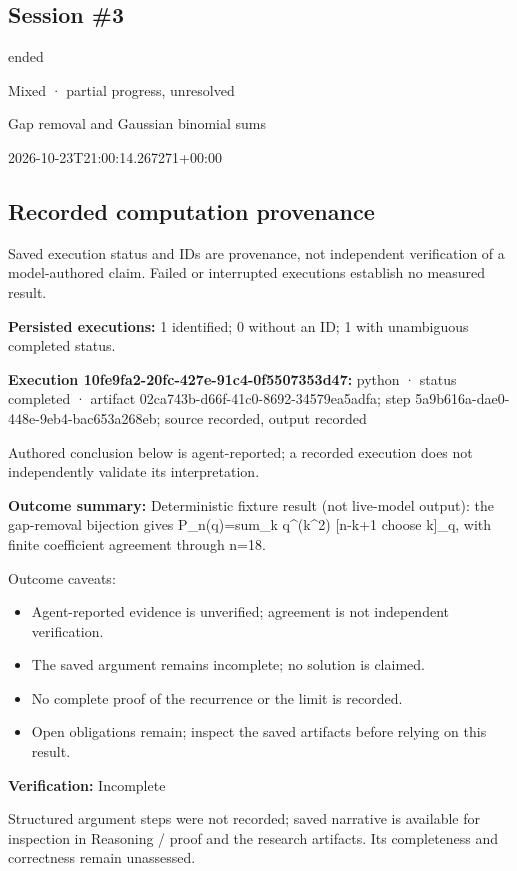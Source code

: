 \documentclass[11pt]{article}
\begin{document}
\subsection{Session \#3}
\begin{description}[style=nextline,font=\normalfont\bfseries,leftmargin=0pt,labelsep=0pt]
\item[Execution status] ended
\item[Outcome] Mixed · partial progress, unresolved
\item[Strategy] Gap removal and Gaussian binomial sums
\item[Started] 2026-10-23T21:00:14.267271+00:00
\end{description}
\subsection{Recorded computation provenance}
Saved execution status and IDs are provenance, not independent verification of a model-authored claim. Failed or interrupted executions establish no measured result.\par
\textbf{Persisted executions:} 1 identified; 0 without an ID; 1 with unambiguous completed status.\par
\textbf{Execution 10fe9fa2-20fc-427e-91c4-0f5507353d47:} python · status completed · artifact 02ca743b-d66f-41c0-8692-34579ea5adfa; step 5a9b616a-dae0-448e-9eb4-bac653a268eb; source recorded, output recorded\par
Authored conclusion below is agent-reported; a recorded execution does not independently validate its interpretation.\par
\textbf{Outcome summary:} Deterministic fixture result (not live-model output): the gap-removal bijection gives P\_n(q)=sum\_k q\textasciicircum{}(k\textasciicircum{}2) [n-k+1 choose k]\_q, with finite coefficient agreement through n=18.\par
Outcome caveats:\par
\begin{itemize}
\item Agent-reported evidence is unverified; agreement is not independent verification.
\item The saved argument remains incomplete; no solution is claimed.
\item No complete proof of the recurrence or the limit is recorded.
\item Open obligations remain; inspect the saved artifacts before relying on this result.
\end{itemize}
\textbf{Verification:} Incomplete\par
Structured argument steps were not recorded; saved narrative is available for inspection in Reasoning / proof and the research artifacts. Its completeness and correctness remain unassessed.\par
\end{document}
